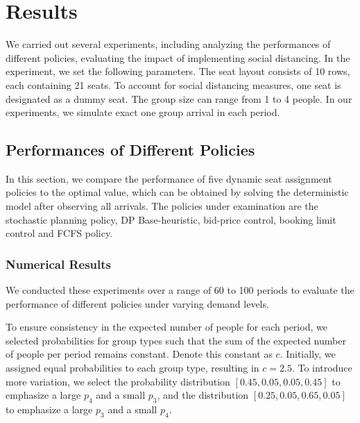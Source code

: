 \section{Results}
We carried out several experiments, including analyzing the performances of different policies, evaluating the impact of implementing social distancing.
In the experiment, we set the following parameters. The seat layout consists of 10 rows, each containing 21 seats. To account for social distancing measures, one seat is designated as a dummy seat. The group size can range from 1 to 4 people. In our experiments, we simulate exact one group arrival in each period.


\subsection{Performances of Different Policies}
In this section, we compare the performance of five dynamic seat assignment policies to the optimal value, which can be obtained by solving the deterministic model after observing all arrivals. The policies under examination are the stochastic planning policy, DP Base-heuristic, bid-price control, booking limit control and FCFS policy. 



\subsubsection*{Numerical Results}
We conducted these experiments over a range of 60 to 100 periods to evaluate the performance of different policies under varying demand levels.

To ensure consistency in the expected number of people for each period, we selected probabilities for group types such that the sum of the expected number of people per period remains constant. Denote this constant as $c$. Initially, we assigned equal probabilities to each group type, resulting in $c = 2.5$. To introduce more variation, we select the probability distribution $[0.45, 0.05, 0.05, 0.45]$ to emphasize a large $p_4$ and a small $p_3$, and the distribution $[0.25, 0.05, 0.65, 0.05]$ to emphasize a large $p_3$ and a small $p_4$. 



